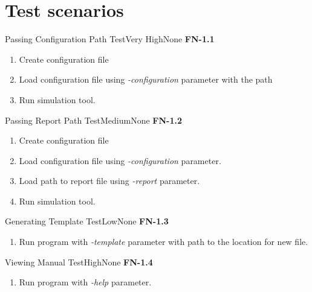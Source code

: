 \chapter{Test scenarios} \label{chp:test-scenarios}
	\begin{testcase}{Passing Configuration Path Test}{Very High}{None}
		{
			\textbf{FN-1.1}
		}
		{
			\begin{enumerate}
				\item Create configuration file
				\item Load configuration file using \emph{-configuration} parameter with the path
				\item Run simulation tool.
			\end{enumerate}
		}
	\end{testcase}
	
	\begin{testcase}{Passing Report Path Test}{Medium}{None}
		{
			\textbf{FN-1.2}
		}
		{
			\begin{enumerate}
				\item Create configuration file
				\item Load configuration file using \emph{-configuration} parameter.
				\item Load path to report file using \emph{-report} parameter.
				\item Run simulation tool.
			\end{enumerate}
		}
	\end{testcase}
	
	\begin{testcase}{Generating Template Test}{Low}{None}
		{
			\textbf{FN-1.3}
		}
		{
			\begin{enumerate}
				\item Run program with \emph{-template} parameter with path to the location for new file.
			\end{enumerate}
		}
	\end{testcase}

	\begin{testcase}{Viewing Manual Test}{High}{None}
		{
			\textbf{FN-1.4}
		}
		{
			\begin{enumerate}
				\item Run program with \emph{-help} parameter.
			\end{enumerate}
		}
	\end{testcase}